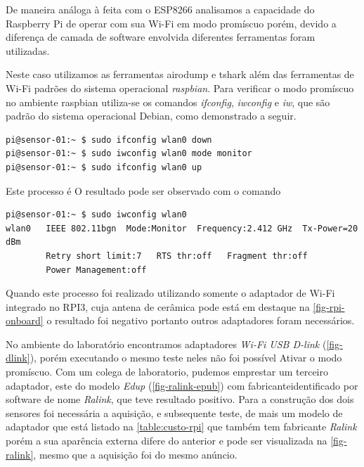 De maneira análoga à feita com o ESP8266 analisamos a capacidade do Raspberry Pi
de operar com sua Wi-Fi em modo promíscuo porém,  devido  a diferença de camada
de software envolvida diferentes ferramentas foram utilizadas.

Neste caso utilizamos as ferramentas airodump e tshark além das ferramentas de
Wi-Fi padrões do sistema operacional \emph{raspbian}. Para verificar o modo
promíscuo no ambiente raspbian utiliza-se os comandos \emph{ifconfig},
\emph{iwconfig} e \emph{iw}, que são padrão do sistema operacional Debian, como
demonstrado a seguir.

\begin{verbatim}
pi@sensor-01:~ $ sudo ifconfig wlan0 down
pi@sensor-01:~ $ sudo iwconfig wlan0 mode monitor
pi@sensor-01:~ $ sudo ifconfig wlan0 up
\end{verbatim}

Este processo é
O resultado pode ser observado com o comando

\begin{verbatim}
pi@sensor-01:~ $ sudo iwconfig wlan0
wlan0   IEEE 802.11bgn  Mode:Monitor  Frequency:2.412 GHz  Tx-Power=20 dBm
        Retry short limit:7   RTS thr:off   Fragment thr:off
        Power Management:off
\end{verbatim}

Quando este processo foi realizado utilizando somente o adaptador de Wi-Fi
integrado no RPI3, cuja antena de cerâmica pode está em destaque na
\autoref{fig-rpi-onboard} o resultado foi negativo portanto outros adaptadores
foram necessários.

No ambiente do laboratório encontramos adaptadores \emph{Wi-Fi USB D-link}
(\autoref{fig-dlink}), porém executando o mesmo teste neles não foi possível
Ativar o modo promíscuo. Com um colega de laboratorio, pudemos emprestar um
terceiro adaptador, este do modelo \emph{Edup} (\autoref{fig-ralink-epub}) com
fabricanteidentificado por software de nome \emph{Ralink}, que teve resultado
positivo. Para a construção dos dois sensores foi necessária a aquisição, e
subsequente teste, de mais um modelo de adaptador que está listado na
\autoref{table:custo-rpi} que também tem fabricante \emph{Ralink} porém a sua
aparência externa difere do anterior e pode ser visualizada na
\autoref{fig-ralink}, mesmo que a aquisição foi do mesmo anúncio.

